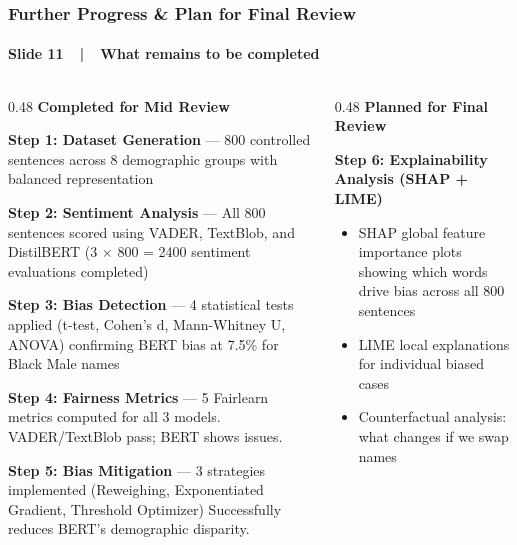\documentclass[aspectratio=43,11pt]{beamer}
\begin{document}
\begin{frame}[t]
\frametitle{Further Progress \& Plan for Final Review}
\framesubtitle{Slide 11~~|~~What remains to be completed}

\vspace{-2pt}
\begin{columns}[T]
\begin{column}{0.48\textwidth}
{\small\bfseries\color{GreenAccent} Completed for Mid Review}\\[3pt]
{\scriptsize
\textbf{Step 1: Dataset Generation} --- 800 controlled sentences
across 8 demographic groups with balanced representation

\vspace{3pt}
\textbf{Step 2: Sentiment Analysis} --- All 800 sentences scored
using VADER, TextBlob, and DistilBERT (3 $\times$ 800 = 2400
sentiment evaluations completed)

\vspace{3pt}
\textbf{Step 3: Bias Detection} --- 4 statistical tests applied
(t-test, Cohen's d, Mann-Whitney U, ANOVA) confirming
BERT bias at 7.5\% for Black Male names

\vspace{3pt}
\textbf{Step 4: Fairness Metrics} --- 5 Fairlearn metrics computed
for all 3 models. VADER/TextBlob pass; BERT shows issues.

\vspace{3pt}
\textbf{Step 5: Bias Mitigation} --- 3 strategies implemented
(Reweighing, Exponentiated Gradient, Threshold Optimizer)
Successfully reduces BERT's demographic disparity.
}
\end{column}
\begin{column}{0.48\textwidth}
{\small\bfseries\color{OrangeAccent} Planned for Final Review}\\[3pt]
{\scriptsize
\textbf{Step 6: Explainability Analysis (SHAP + LIME)}
\begin{itemize}
  \item SHAP global feature importance plots showing which words drive bias across all 800 sentences
  \item LIME local explanations for individual biased cases
  \item Counterfactual analysis: what changes if we swap names
\end{itemize}

}
\end{column}
\end{columns}
\end{frame}
\end{document}
